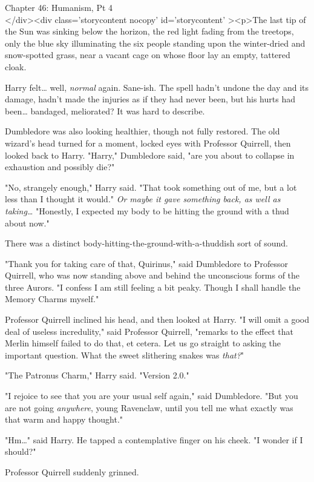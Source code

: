 
Chapter 46: Humanism, Pt 4\\
</div><div  class='storycontent nocopy' id='storycontent' ><p>The last tip of 
the Sun was sinking below the horizon, the red light fading from the treetops, 
only the blue sky illuminating the six people standing upon the winter-dried 
and snow-spotted grass, near a vacant cage on whose floor lay an empty, 
tattered cloak.

Harry felt{\ldots} well, \emph{normal} again. Sane-ish. The spell hadn't undone 
the day and its damage, hadn't made the injuries as if they had never been, but 
his hurts had been{\ldots} bandaged, meliorated? It was hard to describe.

Dumbledore was also looking healthier, though not fully restored. The old 
wizard's head turned for a moment, locked eyes with Professor Quirrell, then 
looked back to Harry. "Harry," Dumbledore said, "are you about to collapse in 
exhaustion and possibly die?"

"No, strangely enough," Harry said. "That took something out of me, but a lot 
less than I thought it would." \emph{Or maybe it gave something back, as well 
as taking{\ldots}} "Honestly, I expected my body to be hitting the ground with 
a thud about now."

There was a distinct body-hitting-the-ground-with-a-thuddish sort of sound.

"Thank you for taking care of that, Quirinus," said Dumbledore to Professor 
Quirrell, who was now standing above and behind the unconscious forms of the 
three Aurors. "I confess I am still feeling a bit peaky. Though I shall handle 
the Memory Charms myself."

Professor Quirrell inclined his head, and then looked at Harry. "I will omit a 
good deal of useless incredulity," said Professor Quirrell, "remarks to the 
effect that Merlin himself failed to do that, et cetera. Let us go straight to 
asking the important question. What the sweet slithering snakes was 
\emph{that?}"

"The Patronus Charm," Harry said. "Version 2.0."

"I rejoice to see that you are your usual self again," said Dumbledore. "But 
you are not going \emph{anywhere}, young Ravenclaw, until you tell me what 
exactly was that warm and happy thought."

"Hm{\ldots}" said Harry. He tapped a contemplative finger on his cheek. "I 
wonder if I should?"

Professor Quirrell suddenly grinned.

